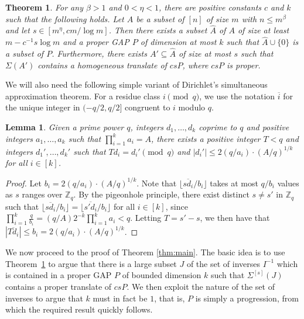 \documentclass{daj}
\newtheorem{theorem}{Theorem}
\newtheorem{lemma}{Lemma}
\newcommand{\bZ}{\mathbb{Z}}
\newcommand{\ol}[1]{\overline{#1}}
\begin{document}
\begin{theorem} \label{thm:hom-AP-build} 
For any $\beta>1$ and $0<\eta<1$, there are positive constants $c$ and $k$ such that the following holds. Let $A$ be a subset of $[n]$ of size $m$ with $n\le m^{\beta}$ and let $s\in[m^{\eta},cm/\log m]$. Then there exists a subset $\hat{A}$ of $A$ of size at least $m-c^{-1}s\log m$ and a proper GAP $P$ of dimension at most $k$ such
that $\hat{A} \cup \{0\}$ is a subset of $P$. Furthermore, there exists
$A'\subseteq \hat{A}$ of size at most $s$ such that $\Sigma(A')$
contains a homogeneous translate of $csP$, where $csP$ is proper.
\end{theorem}

We will also need the following simple variant of Dirichlet's simultaneous approximation theorem. For a residue class $i\pmod q$, we use the notation $\ol{i}$ for the unique integer in $(-q/2,q/2]$ congruent to $i$ modulo $q$. 

\begin{lemma}\label{lem:nbh} 
    Given a prime power $q$, integers $d_1,\dots,d_k$ coprime to $q$ and positive integers $a_1,\dots,a_k$ such that $\prod_{i=1}^{k} a_i = A$, there exists a positive integer $T < q$ and integers $d_1',\ldots, d_k'$ such that $Td_i = d_i' \pmod q$ and $|d_i'| \le 2 (q/a_i) \cdot (A/q)^{1/k}$ for all $i\in [k]$.
\end{lemma}
\begin{proof}
    Let $b_i = 2 (q/a_i) \cdot (A/q)^{1/k}$. Note that $\lfloor \ol {sd_i}/b_i\rfloor$ takes at most $q/b_i$ values as $s$ ranges over $\bZ_q$. By the pigeonhole principle, there exist distinct $s\ne s'$ in $\bZ_q$ such that $\lfloor \ol{sd_i} / b_i\rfloor = \lfloor \ol{s'd_i} / b_i\rfloor$ for all $i\in [k]$, since $\prod_{i=1}^{k} \frac{q}{b_i} = (q/A) 2^{-k}\prod_{i=1}^{k} a_i < q$. Letting $T=s'-s$, we then have that $|\ol{Td_i}| \le b_i = 2 (q/a_i) \cdot (A/q)^{1/k}$.  
\end{proof}

We now proceed to the proof of Theorem \ref{thm:main}. The basic idea is to use Theorem~\ref{thm:hom-AP-build} to argue that there is a large subset $J$ of the set of inverses $I^{-1}$ which is contained in a proper GAP $P$ of bounded dimension $k$ such that $\Sigma^{[s]}(J)$ contains a proper translate of $csP$. 
We then exploit the nature of the set of inverses to argue that $k$ must in fact be $1$, that is, $P$ is simply a progression, from which the required result quickly follows.
\end{document}
